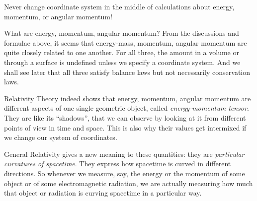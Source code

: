 \documentclass[a4paper,12pt,%
onecolumn,oneside,titlepage,%
british%
]{memoir}
\newcommand{\mynotew}[1]{{\footnotesize\color{midgrey}\faIcon{tools}\ #1}}
\renewcommand*{\|}[1][]{\nonscript\:#1\vert\nonscript\:\mathopen{}}
\newcommand*{\sect}{\S}%
\newcommand*{\energym}{energy-mass}
\begin{document}
\begin{warning}
  Never change coordinate system in the middle of calculations about energy, momentum, or angular momentum!
\end{warning}



\bigskip

\begin{extra}{{What are energy, momentum, angular momentum?}}
From the discussions and formulae above, it seems that \energym, momentum, angular momentum are quite closely related to one another. For all three, the amount in a volume or through a surface is undefined unless we specify a coordinate system. And we shall see later that all three satisfy balance laws but not necessarily conservation laws.

  Relativity Theory indeed shows that energy, momentum, angular momentum are different aspects of one single geometric object, called \emph{energy-momentum tensor}. They are like its \enquote{shadows}, that we can observe by looking at it from different points of view in time and space. This is also why their values get intermixed if we change our system of coordinates. %

  General Relativity gives a new meaning to these quantities: they are \emph{particular curvatures of spacetime}. They express how spacetime is curved in different directions. So whenever we measure, say, the energy or the momentum of some object or of some electromagnetic radiation, we are actually measuring how much that object or radiation is curving spacetime in a particular way. %
\end{extra}
%
\end{document}
